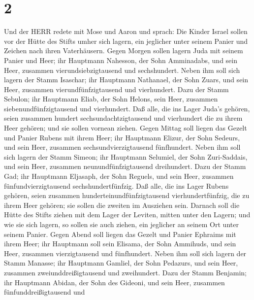 \hypertarget{section-1}{%
\section{2}\label{section-1}}

 Und der HERR redete mit Mose und Aaron und sprach:
 Die Kinder Israel sollen vor der Hütte des Stifts umher
sich lagern, ein jeglicher unter seinem Panier und Zeichen nach ihren
Vaterhäusern.  Gegen Morgen sollen lagern Juda mit seinem
Panier und Heer; ihr Hauptmann Nahesson, der Sohn Amminadabs,
 und sein Heer, zusammen vierundsiebzigtausend und
sechshundert.  Neben ihm soll sich lagern der Stamm
Isaschar; ihr Hauptmann Nathanael, der Sohn Zuars,  und sein
Heer, zusammen vierundfünfzigtausend und vierhundert.  Dazu
der Stamm Sebulon; ihr Hauptmann Eliab, der Sohn Helons, 
sein Heer, zusammen siebenundfünfzigtausend und vierhundert.
 Daß alle, die ins Lager Juda's gehören, seien zusammen
hundert sechsundachtzigtausend und vierhundert die zu ihrem Heer
gehören; und sie sollen vornean ziehen.  Gegen Mittag soll
liegen das Gezelt und Panier Rubens mit ihrem Heer; ihr Hauptmann
Elizur, der Sohn Sedeurs,  und sein Heer, zusammen
sechsundvierzigtausend fünfhundert.  Neben ihm soll sich
lagern der Stamm Simeon; ihr Hauptmann Selumiel, der Sohn Zuri-Saddais,
 und sein Heer, zusammen neunundfünfzigtausend dreihundert.
 Dazu der Stamm Gad; ihr Hauptmann Eljasaph, der Sohn
Reguels,  und sein Heer, zusammen fünfundvierzigtausend
sechshundertfünfzig.  Daß alle, die ins Lager Rubens
gehören, seien zusammen hunderteinundfünfzigtausend vierhundertfünfzig,
die zu ihrem Heer gehören; sie sollen die zweiten im Ausziehen sein.
 Darnach soll die Hütte des Stifts ziehen mit dem Lager der
Leviten, mitten unter den Lagern; und wie sie sich lagern, so sollen sie
auch ziehen, ein jeglicher an seinem Ort unter seinem Panier.
 Gegen Abend soll liegen das Gezelt und Panier Ephraims mit
ihrem Heer; ihr Hauptmann soll sein Elisama, der Sohn Ammihuds,
 und sein Heer, zusammen vierzigtausend und fünfhundert.
 Neben ihm soll sich lagern der Stamm Manasse; ihr
Hauptmann Gamliel, der Sohn Pedazurs,  und sein Heer,
zusammen zweiunddreißigtausend und zweihundert.  Dazu der
Stamm Benjamin; ihr Hauptmann Abidan, der Sohn des Gideoni,
 und sein Heer, zusammen fünfunddreißigtausend und
